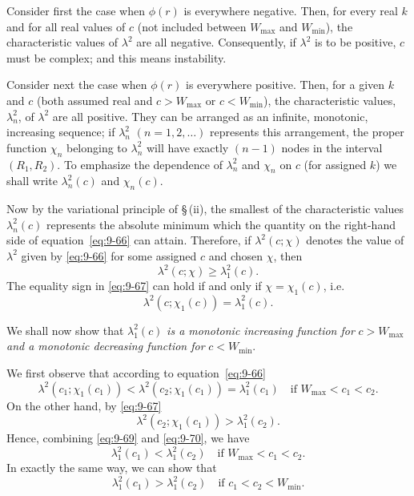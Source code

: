 Consider first the case when $\phi(r)$ is everywhere negative. Then, for every real $k$ and for all real values of $c$ (not included between $W_\mathrm{max}$ and $W_\mathrm{min}$), the characteristic values of $\lambda^2$ are all negative. Consequently, if $\lambda^2$ is to be positive, $c$ must be complex; and this means instability.

Consider next the case when $\phi(r)$ is everywhere positive. Then, for a given $k$ and $c$ (both assumed real and $c > W_\mathrm{max}$ or $c < W_\mathrm{min}$), the characteristic values, $\lambda_n^2$, of $\lambda^2$ are all positive. They can be arranged as an infinite, monotonic, increasing sequence; if $\lambda_n^2$ $(n = 1, 2, \ldots)$ represents this arrangement, the proper function $\chi_n$ belonging to $\lambda_n^2$ will have exactly $(n-1)$ nodes in the interval $(R_1, R_2)$. To emphasize the dependence of $\lambda_n^2$ and $\chi_n$ on $c$ (for assigned $k$) we shall write $\lambda_n^2(c)$ and $\chi_n(c)$.

Now by the variational principle of \S\,(ii), the smallest of the characteristic values $\lambda_n^2(c)$ represents the absolute minimum which the quantity on the right-hand side of equation~\eqref{eq:9-66} can attain. Therefore, if $\lambda^2(c; \chi)$ denotes the value of $\lambda^2$ given by \eqref{eq:9-66} for some assigned $c$ and chosen $\chi$, then
\begin{equation}
\lambda^2(c; \chi) \geqslant \lambda_1^2(c). \label{eq:9-67}
\end{equation}
The equality sign in \eqref{eq:9-67} can hold if and only if $\chi = \chi_1(c)$, i.e.
\begin{equation}
\lambda^2(c; \chi_1(c)) = \lambda_1^2(c). \label{eq:9-68}
\end{equation}

We shall now show that $\lambda_1^2(c)$ \emph{is a monotonic increasing function for} $c > W_\mathrm{max}$ \emph{and a monotonic decreasing function for} $c < W_\mathrm{min}$.

We first observe that according to equation~\eqref{eq:9-66}
\begin{equation}
\lambda^2(c_1; \chi_1(c_1)) < \lambda^2(c_2; \chi_1(c_1)) = \lambda_1^2(c_1) \quad \text{if } W_\mathrm{max} < c_1 < c_2. \label{eq:9-69}
\end{equation}
On the other hand, by \eqref{eq:9-67}
\begin{equation}
\lambda^2(c_2; \chi_1(c_1)) > \lambda_1^2(c_2). \label{eq:9-70}
\end{equation}
Hence, combining \eqref{eq:9-69} and \eqref{eq:9-70}, we have
\begin{equation}
\lambda_1^2(c_1) < \lambda_1^2(c_2) \quad \text{if } W_\mathrm{max} < c_1 < c_2. \label{eq:9-71}
\end{equation}
In exactly the same way, we can show that
\begin{equation}
\lambda_1^2(c_1) > \lambda_1^2(c_2) \quad \text{if } c_1 < c_2 < W_\mathrm{min}. \label{eq:9-72}
\end{equation}

